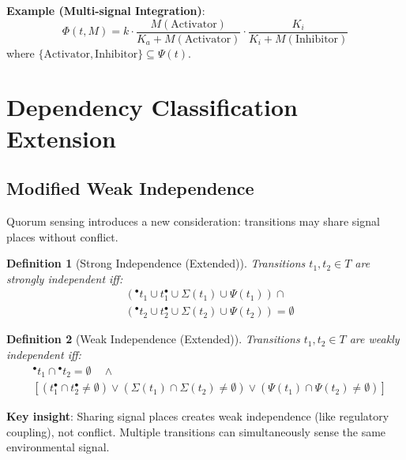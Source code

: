 \documentclass[11pt]{article}
\newtheorem{definition}{Definition}
\newcommand{\preset}[1]{{\ensuremath{^{\bullet}#1}}}
\newcommand{\postset}[1]{{\ensuremath{#1^{\bullet}}}}
\newcommand{\RegSet}[1]{{\Sigma(#1)}}
\newcommand{\SignalSet}[1]{{\Psi(#1)}}
\begin{document}
\textbf{Example (Multi-signal Integration)}:
\begin{equation}
\Phi(t, M) = k \cdot \frac{M(\text{Activator})}{K_a + M(\text{Activator})} \cdot \frac{K_i}{K_i + M(\text{Inhibitor})}
\end{equation}
where $\{\text{Activator}, \text{Inhibitor}\} \subseteq \SignalSet{t}$.

\section{Dependency Classification Extension}

\subsection{Modified Weak Independence}

Quorum sensing introduces a new consideration: transitions may share signal places without conflict.

\begin{definition}[Strong Independence (Extended)]
Transitions $t_1, t_2 \in T$ are \emph{strongly independent} iff:
\begin{equation}
\begin{aligned}
&(\preset{t_1} \cup \postset{t_1} \cup \RegSet{t_1} \cup \SignalSet{t_1}) \cap \\
&(\preset{t_2} \cup \postset{t_2} \cup \RegSet{t_2} \cup \SignalSet{t_2}) = \emptyset
\end{aligned}
\end{equation}
\end{definition}

\begin{definition}[Weak Independence (Extended)]
Transitions $t_1, t_2 \in T$ are \emph{weakly independent} iff:
\begin{equation}
\begin{aligned}
&\preset{t_1} \cap \preset{t_2} = \emptyset \quad \land \\
&\left[(\postset{t_1} \cap \postset{t_2} \neq \emptyset) \lor (\RegSet{t_1} \cap \RegSet{t_2} \neq \emptyset) \lor (\SignalSet{t_1} \cap \SignalSet{t_2} \neq \emptyset)\right]
\end{aligned}
\end{equation}
\end{definition}

\textbf{Key insight}: Sharing signal places creates weak independence (like regulatory coupling), not conflict. Multiple transitions can simultaneously sense the same environmental signal.
\end{document}
